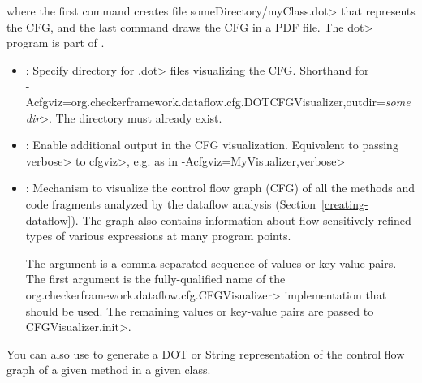 \noindent
where the first command creates file \<someDirectory/myClass.dot> that
represents the CFG, and the last command draws the CFG in a PDF file.
The \<dot> program is part of .


\begin{itemize}

\item {}:
  Specify directory for \<.dot> files visualizing the CFG\@.
  Shorthand for\\
  \<-Acfgviz=org.checkerframework.dataflow.cfg.DOTCFGVisualizer,outdir=\emph{somedir}>.
  The directory must already exist.

\item {}:
  Enable additional output in the CFG visualization.
  Equivalent to passing \<verbose> to \<cfgviz>, e.g. as in
  \<-Acfgviz=MyVisualizer,verbose>

\item {}:
  Mechanism to visualize the control flow graph (CFG) of
  all the methods and code fragments
  analyzed by the dataflow analysis (Section~\ref{creating-dataflow}).
  The graph also contains information about flow-sensitively refined
  types of various expressions at many program points.

  The argument is a comma-separated sequence of values or key-value pairs.
  The first argument is the fully-qualified name of the
  \<org.checkerframework.dataflow.cfg.CFGVisualizer> implementation
  that should be used. The remaining values or key-value pairs are
  passed to \<CFGVisualizer.init>.

\end{itemize}

\noindent
You can also use  to generate a DOT
or String representation of the control flow graph of a given method in a given class.

